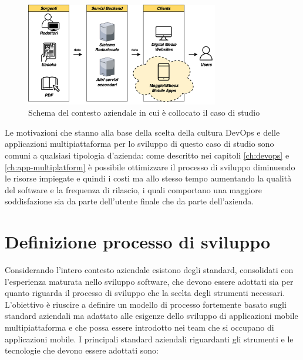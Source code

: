 \begin{figure}[H]
    \centering
    \includegraphics[width=0.75\textwidth]{img/contesto-aziendale.png}
    \caption{Schema del contesto aziendale in cui è collocato il caso di studio}
    \label{contesto-aziendale-fig}
\end{figure}

Le motivazioni che stanno alla base della scelta della cultura DevOps e delle applicazioni multipiattaforma per lo sviluppo di questo caso di studio sono comuni a qualsiasi tipologia d'azienda: 
come descritto nei capitoli \ref{ch:devops} e \ref{ch:app-multiplatform} è possibile ottimizzare il processo di sviluppo diminuendo le risorse impiegate e quindi i costi ma allo stesso tempo aumentando la qualità del software e la frequenza di rilascio,
i quali comportano una maggiore soddisfazione sia da parte dell'utente finale che da parte dell'azienda.

\section{Definizione processo di sviluppo}
Considerando l'intero contesto aziendale esistono degli standard, 
consolidati con l'esperienza maturata nello sviluppo software, 
che devono essere adottati sia per quanto riguarda il processo di sviluppo che la scelta degli strumenti necessari. 
L'obiettivo è riuscire a definire un modello di processo fortemente basato sugli standard aziendali ma adattato alle esigenze dello sviluppo di applicazioni mobile multipiattaforma e che possa essere introdotto nei team che si occupano di applicazioni mobile. 
I principali standard aziendali riguardanti gli strumenti e le tecnologie che devono essere adottati sono:

